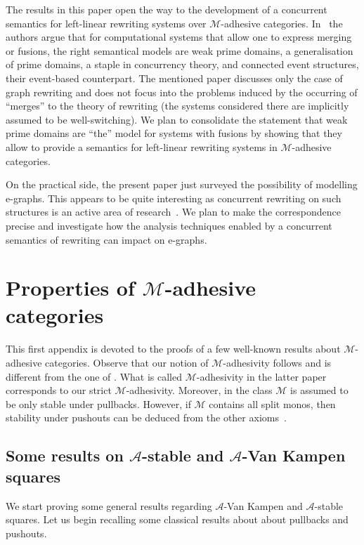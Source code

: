 \documentclass[a4paper,UKenglish,cleveref,pdftex,thm-restate,numberwithinsect]{lipics-v2021}
\begin{document}
The results in this paper open the way to the development of a
concurrent semantics for left-linear rewriting systems over $\mathcal{M}$-adhesive
categories. In~\cite{baldan2017domains} the authors argue that for
computational systems that allow one to express merging or fusions,
the right semantical models are weak prime domains, a generalisation
of prime domains, a staple in concurrency theory, and connected event
structures, their event-based counterpart. The mentioned paper
discusses only the case of graph rewriting and does not focus into the
problems induced by the occurring of ``merges'' to the theory of rewriting (the systems
considered there are implicitly assumed to be well-switching). 
We plan to consolidate the statement that weak prime domains are 
``the'' model for systems with fusions by showing that they allow to provide a semantics
for left-linear rewriting systems in $\mathcal{M}$-adhesive categories.

On the practical side, the present paper just surveyed the possibility
of modelling e-graphs. This appears to be quite interesting as
concurrent rewriting on such structures is an active area of
research~\cite{abs-2208-06295}. 
We plan to make the correspondence precise
and investigate how the analysis techniques enabled by a concurrent
semantics of rewriting can impact on e-graphs.





\appendix
\section{Properties of $\mathcal{M}$-adhesive categories}\label{app:ade}

This first appendix is devoted to the proofs of a few well-known results about $\mathcal{M}$-adhesive categories.
%
Observe that our notion of $\mathcal{M}$-adhesivity follows
\cite{ehrig2012,ehrig2014adhesive} and is different from the one of
\cite{azzi2019essence}. What is called $\mathcal{M}$-adhesivity in
the latter paper corresponds to our strict
$\mathcal{M}$-adhesivity. Moreover, in \cite{azzi2019essence} the
class $\mathcal{M}$ is assumed to be only stable under
pullbacks. However, if $\mathcal{M}$ contains all split monos, then
stability under pushouts can be deduced from the other
axioms~\cite[Prop.~$5.1.21$]{castelnovo2023thesis}.



\subsection{Some results on $\mathcal{A}$-stable and $\mathcal{A}$-Van Kampen squares}
We start proving some general results regarding $\mathcal{A}$-Van Kampen and $\mathcal{A}$-stable squares. Let us begin recalling some classical results about  about pullbacks and pushouts\cite{mac2013categories}.
\end{document}
